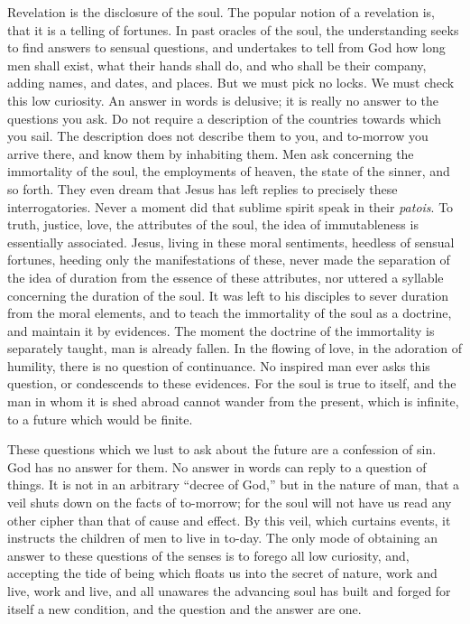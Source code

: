 \documentclass{article}
\begin{document}
Revelation is the disclosure of the soul. The popular notion of a revelation is, that it is a telling of fortunes. In past oracles of the soul, the understanding seeks to find answers to sensual questions, and undertakes to tell from God how long men shall exist, what their hands shall do, and who shall be their company, adding names, and dates, and places. But we must pick no locks. We must check this low curiosity. An answer in words is delusive; it is really no answer to the questions you ask. Do not require a description of the countries towards which you sail. The description does not describe them to you, and to-morrow you arrive there, and know them by inhabiting them. Men ask concerning the immortality of the soul, the employments of heaven, the state of the sinner, and so forth. They even dream that Jesus has left replies to precisely these interrogatories. Never a moment did that sublime spirit speak in their \emph{patois}. To truth, justice, love, the attributes of the soul, the idea of immutableness is essentially associated. Jesus, living in these moral sentiments, heedless of sensual fortunes, heeding only the manifestations of these, never made the separation of the idea of duration from the essence of these attributes, nor uttered a syllable concerning the duration of the soul. It was left to his disciples to sever duration from the moral elements, and to teach the immortality of the soul as a doctrine, and maintain it by evidences. The moment the doctrine of the immortality is separately taught, man is already fallen. In the flowing of love, in the adoration of humility, there is no question of continuance. No inspired man ever asks this question, or condescends to these evidences. For the soul is true to itself, and the man in whom it is shed abroad cannot wander from the present, which is infinite, to a future which would be finite.

These questions which we lust to ask about the future are a confession of sin. God has no answer for them. No answer in words can reply to a question of things. It is not in an arbitrary ``decree of God,'' but in the nature of man, that a veil shuts down on the facts of to-morrow; for the soul will not have us read any other cipher than that of cause and effect. By this veil, which curtains events, it instructs the children of men to live in to-day. The only mode of obtaining an answer to these questions of the senses is to forego all low curiosity, and, accepting the tide of being which floats us into the secret of nature, work and live, work and live, and all unawares the advancing soul has built and forged for itself a new condition, and the question and the answer are one.
\end{document}
